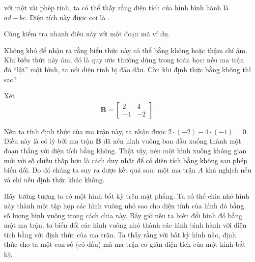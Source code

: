 \documentclass[letterpaper,11pt,english]{sphinxmanual}
\begin{document}
với một vài phép tính, ta có thể thấy rằng diện tích của hình bình hành
là \(ad-bc\). Diện tích này được coi là .



Cùng kiểm tra nhanh điều này với một đoạn mã ví dụ.

\begin{sphinxVerbatim}[commandchars=\\\{\}]
   
\PYG{p}{[}\PYG{p}{[} \PYG{p}{]} \PYG{p}{[} \PYG{p}{]}\PYG{p}{]}
\end{sphinxVerbatim}



Không khó để nhận ra rằng biểu thức này có thể bằng không hoặc thậm chí
âm. Khi biểu thức này âm, đó là quy ước thường dùng trong toán học: nếu
ma trận đó “lật” một hình, ta nói diện tính bị đảo dấu. Còn khi định
thức bằng không thì sao?



Xét
\begin{equation}\label{equation:chapter_appendix_math/geometry-linear-algebric-ops_vn:chapter_appendix_math/geometry-linear-algebric-ops_vn:26}
\begin{split}\mathbf{B} = \begin{bmatrix}
2 & 4 \\ -1 & -2
\end{bmatrix}.\end{split}
\end{equation}


Nếu ta tính định thức của ma trận này, ta nhận được
\(2\cdot(-2 ) - 4\cdot(-1) = 0\). Điều này là có lý bởi ma trận
\(\mathbf{B}\) đã nén hình vuông ban đầu xuống thành một đoạn thẳng
với diện tích bằng không. Thật vậy, nén một hình xuống không gian mới
với số chiều thấp hơn là cách duy nhất để có diện tích bằng không sau
phép biến đổi. Do đó chúng ta suy ra được kết quả sau: một ma trận
\(A\) khả nghịch nếu và chỉ nếu định thức khác không.



Hãy tưởng tượng ta có một hình bất kỳ trên mặt phẳng. Ta có thể chia nhỏ
hình này thành một tập hợp các hình vuông nhỏ sao cho diện tính của hình
đó bằng số lượng hình vuông trong cách chia này. Bây giờ nếu ta biến đổi
hình đó bằng một ma trận, ta biến đổi các hình vuông nhỏ thành các hình
bình hành với diện tích bằng với định thức của ma trận. Ta thấy rằng với
bất kỳ hình nào, định thức cho ta một con số (có dấu) mà ma trận co giãn
diện tích của một hình bất kỳ.
\end{document}
